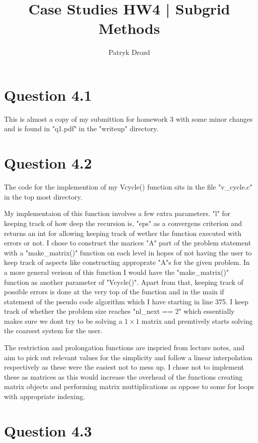 \documentclass[a4paper]{article}
\title{Case Studies HW4 | Subgrid Methods}
\author{Patryk Drozd}
\begin{document}
\date{}
\maketitle

\section*{Question 4.1}

	This is almost a copy of my submittion for homework 3 with some minor changes and 
	is found in "q1.pdf" in the "writeup" directory.

\section*{Question 4.2}
	
	The code for the implemention of my Vcycle() function sits in the file "v\_cycle.c"
	in the top most directory.
	
	My implementaion of this function involves a few extra parameters. "l" for keeping
	track of how deep the recursion is, "eps" as a convergens criterion and returns an
	int for allowing keeping track of wether the function executed with errors or not.
	I chose to construct the marices "A" part of the problem statement with a 
	"make\_matrix()" function on each level in hopes of not having the user to keep track 
	of aspects like constructing approprate "A"s for the given problem. In a more general 
	verison of this function I would have the "make\_matrix()" function as another
	parameter of "Vcycle()". Apart from that, keeping track of possible errors is 
	done at the very top of the function and in the main if statement of the 	
	pseudo code algorithm which I have starting in line 375. I keep track of whether
	the problem size reaches "nl\_next == 2" which essentially makes sure we dont 
	try to be solving a $1 \times 1$ matrix and premtively starts solving the coarsest
	system for the user. 

	The restriction and prolongation functions are inspried from lecture notes,
	and aim to pick out relevant values for the simplicity and follow a linear 
	interpolation respectively as these were the easiest not to mess up. I chose
	not to implement these as matrices as this would increase the overhead of the
	functions creating matrix objects and performing matrix muttiplications as 
	oppose to some for loops with appropriate indexing.
	
	
	
\section*{Question 4.3}
	
\end{document}
